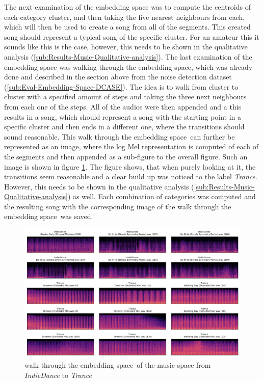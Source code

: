 \newline
\newline
The next examination of the embedding space was to compute the centroids of each category cluster, and then taking the five nearest neighbours from each, which will then be used to create a song from all of the segments. This created song should represent a typical song of the specific cluster. For an amateur this it sounds like this is the case, however, this needs to be shown in the qualitative analysis (\ref{sub:Results-Music-Qualitative-analysis}).
\newline
\newline
The last examination of the embedding space was walking through the embedding space, which was already done and described in the section above from the noise detection dataset (\ref{sub:Eval-Embedding-Space-DCASE}). The idea is to walk from cluster to cluster with a specified amount of steps and taking the three next neighbours from each one of the steps. All of the audios were then appended and a this results in a song, which should represent a song with the starting point in a specific cluster and then ends in a different one, where the transitions should sound reasonable. This \flqq walk through the embedding space\frqq \ can further be represented as an image, where the log Mel representation is computed of each of the segments and then appended as a sub-figure to the overall figure. Such an image is shown in figure \ref{fig:Walk-through-Music}. The figure shows, that when purely looking at it, the transitions seem reasonable and a clear build up was noticed to the label \textit{Trance}. However, this needs to be shown in the qualitative analysis (\ref{sub:Results-Music-Qualitative-analysis}) as well. Each combination of categories was computed and the resulting song with the corresponding image of the \flqq walk through the embedding space\frqq \ was saved.
\begin{figure}[ht]
\centering
    \includegraphics[width=0.9\linewidth]{img/Walk_through_music_space.png}
    \caption{\flqq walk through the embedding space\frqq \ of the music space from \textit{IndieDance} to \textit{Trance}}
    \label{fig:Walk-through-Music}
\end{figure}

